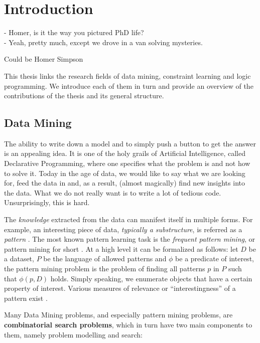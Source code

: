 \chapter{Introduction}\label{ch:introduction}
\epigraph{
- Homer, is it the way you pictured PhD life?\\
- Yeah, pretty much, except we drove in a van solving mysteries.
}{Could be Homer Simpson}

\begin{addmargin}[5em]{5em}
This thesis links the research fields of data mining, constraint learning
and logic programming. We introduce each of them in turn and provide an overview of the
contributions of the thesis and
its general structure.
\end{addmargin}

\section{Data Mining}
The ability to write down a model and to simply push a button to get the
answer is an appealing idea. It is one of the holy grails of
Artificial Intelligence, called Declarative Programming, where one
specifies what the problem is and not how to solve it. Today in the age of data, we would like
to say what we are looking for, feed the data in and, as a result,
(almost magically) find new insights into the data. What we do not really want is to write
a lot of tedious code. Unsurprisingly, this is hard. 


The \textit{knowledge} extracted from the data can manifest itself in
multiple forms. For example, an interesting piece of data,
\textit{typically a substructure}, is referred as a \textit{pattern} \parencite{han_book}. 
The most known pattern learning task is the
\textit{frequent pattern mining}, or pattern mining for short \parencite{survey_han}. 
At a high level it can be formalized as follows: 
let $D$ be a dataset, $P$ be the language of allowed patterns and
$\phi$ be a predicate of
interest, the pattern mining problem is the problem of finding
all patterns $p$ in $P$ such that $\phi(p,D)$ holds.
Simply speaking, we enumerate objects that have a certain property of
interest.
Various measures of relevance or ``interestingness'' of a pattern exist \parencite{tias_topk}.


Many Data Mining problems, and especially pattern mining
problems, are \textbf{combinatorial search problems}, which in turn have two main components to them, namely problem modelling and search: 

